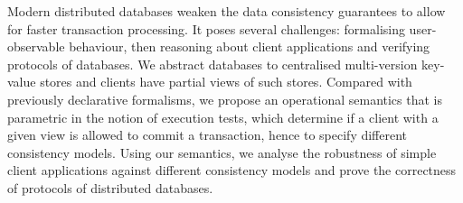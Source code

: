Modern distributed databases weaken the data consistency guarantees 
to allow for faster transaction processing. 
It poses several challenges: formalising user-observable behaviour,
then reasoning about client applications 
and verifying protocols of databases.
We abstract databases to centralised multi-version key-value stores and 
clients have partial views of such stores.
Compared with previously declarative formalisms,
we propose an operational semantics that is parametric in the notion of execution tests, 
which determine if a client with a given view is allowed to commit a transaction,
hence to specify different consistency models. 
Using our semantics, 
we analyse the robustness of simple client applications 
against different consistency models and prove the correctness 
of protocols of distributed databases.
